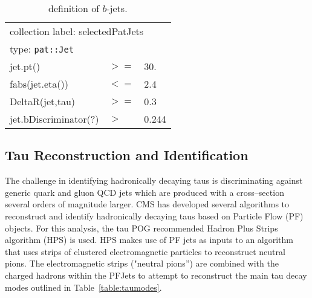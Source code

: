 \begin{table}[htb]
  \caption{definition of $b$-jets.}
  \label{table:bjetobjdefinition}
  \begin{center}
  \ttfamily\scriptsize\selectfont
  \begin{tabular}{|l|ll|}
    \hline
    \multicolumn{3}{|l|}{ collection label: selectedPatJets}\\
    \multicolumn{3}{|l|}{ type: \texttt{pat::Jet}}\\
    \hline
    jet.pt() & $>=$ &  30. \\
    fabs(jet.eta()) & $<=$ & 2.4 \\
    DeltaR(jet,tau) & $>=$ & 0.3 \\
    jet.bDiscriminator(?) & $>$ & 0.244 \\
    \hline
  \end{tabular}
  \end{center}
\end{table}
\subsection{Tau Reconstruction and Identification}

The challenge in identifying hadronically decaying taus is discriminating against generic quark and gluon QCD jets which are produced with a cross--section several orders of magnitude larger. CMS has developed several algorithms to reconstruct and identify hadronically decaying taus based on Particle Flow (PF) objects. For this analysis, the tau POG recommended Hadron Plus Strips algorithm (HPS) is used. HPS makes use of PF jets as inputs to an algorithm that uses strips of clustered electromagnetic particles to reconstruct neutral pions. The electromagnetic strips ("neutral pions'') are combined with the charged hadrons within the PFJets to attempt to reconstruct the main tau decay modes outlined in Table~\ref{table:taumodes}.

\begin{table}[ht]
  \caption{Reconstructed Tau Decay Modes}
   \label{table:taumodes}
\end{table}

